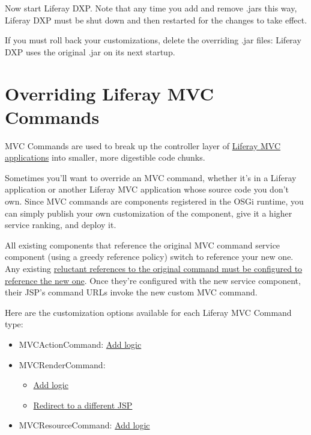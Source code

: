 Now start Liferay DXP. Note that any time you add and remove .jars this
way, Liferay DXP must be shut down and then restarted for the changes to
take effect.

If you must roll back your customizations, delete the overriding .jar
files: Liferay DXP uses the original .jar on its next startup.

\chapter{Overriding Liferay MVC
Commands}\label{overriding-liferay-mvc-commands}

MVC Commands are used to break up the controller layer of
\href{/docs/7-2/appdev/-/knowledge_base/a/liferay-mvc-portlet}{Liferay
MVC applications} into smaller, more digestible code chunks.

Sometimes you'll want to override an MVC command, whether it's in a
Liferay application or another Liferay MVC application whose source code
you don't own. Since MVC commands are components registered in the OSGi
runtime, you can simply publish your own customization of the component,
give it a higher service ranking, and deploy it.

All existing components that reference the original MVC command service
component (using a greedy reference policy) switch to reference your new
one. Any existing
\href{/docs/7-2/customization/-/knowledge_base/c/overriding-osgi-services}{reluctant
references to the original command must be configured to reference the
new one}. Once they're configured with the new service component, their
JSP's command URLs invoke the new custom MVC command.

Here are the customization options available for each Liferay MVC
Command type:

\begin{itemize}
\tightlist
\item
  MVCActionCommand:
  \href{/docs/7-2/customization/-/knowledge_base/c/overriding-mvcactioncommand}{Add
  logic}
\item
  MVCRenderCommand:

  \begin{itemize}
  \tightlist
  \item
    \href{/docs/7-2/customization/-/knowledge_base/c/overriding-mvcrendercommand\#adding-logic-to-an-existing-mvc-render-command}{Add
    logic}
  \item
    \href{/docs/7-2/customization/-/knowledge_base/c/overriding-mvcrendercommand\#redirecting-to-a-new-jsp}{Redirect
    to a different JSP}
  \end{itemize}
\item
  MVCResourceCommand:
  \href{/docs/7-2/customization/-/knowledge_base/c/overriding-mvcresourcecommand}{Add
  logic}
\end{itemize}

